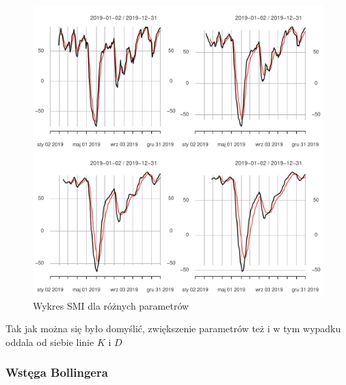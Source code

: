 \documentclass[12pt, a4paper]{article}\usepackage[]{graphicx}\usepackage[]{color}
\makeatletter
\def\maxwidth{ %
  \ifdim\Gin@nat@width>\linewidth
    \linewidth
  \else
    \Gin@nat@width
  \fi
}
\newenvironment{knitrout}{}{} %
\makeatother
\begin{document}
\begin{knitrout}
\color{fgcolor}\begin{figure}[H]

{\centering \includegraphics[width=\maxwidth]{figure/unnamed-chunk-7-1} 

}

\caption[Wykres SMI dla różnych parametrów]{Wykres SMI dla różnych parametrów}\label{fig:unnamed-chunk-7}
\end{figure}

\end{knitrout}

Tak jak można się było domyślić, zwiększenie parametrów też i w tym wypadku oddala od siebie linie $K$ i $D$


\subsubsection{Wstęga Bollingera}
\end{document}
